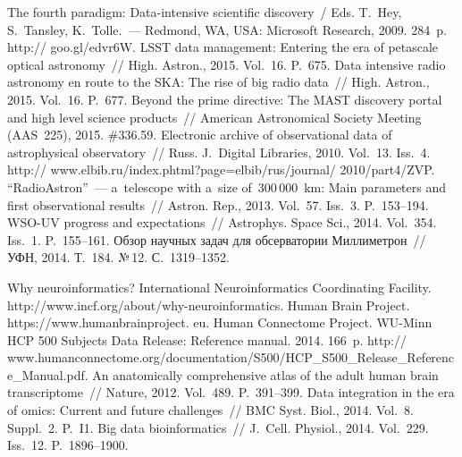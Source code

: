 \begin{multicols}{2}
{{\begin{thebibliography}{99}
The fourth paradigm: Data-intensive scientific discovery~/
Eds. T.~Hey, S.~Tansley, K.~Tolle.~--- Redmond, WA, USA: Microsoft Research, 2009. 284~p.
{\sf http:// goo.gl/edvr6W}.
 LSST data management: Entering the era of petascale optical astronomy~// 
High. Astron., 2015. Vol.~16. P.~675.
 Data intensive radio astronomy en route to the SKA: The rise of big radio data~// 
High. Astron., 2015. Vol.~16. P.~677.
 Beyond the prime directive: The MAST 
discovery portal and high level science products~// American Astronomical Society Meeting (AAS~225), 
2015. \#336.59. 
 Electronic archive of observational data of 
astrophysical observatory~// Russ. J.~Digital Libraries, 2010. Vol.~13. Iss.~4. {\sf 
http:// www.elbib.ru/index.phtml?page=elbib/rus/journal/ 2010/part4/ZVP}.
``RadioAstron''~--- a~telescope with a~size 
of~300\,000~km: Main parameters and first observational results~// Astron. Rep., 2013. Vol.~57. 
Iss.~3. P.~153--194.
 WSO-UV progress and 
expectations~// Astrophys. Space Sci., 2014. Vol.~354. Iss.~1. P.~155--161.
Обзор научных задач для обсерватории Миллиметрон~// УФН, 2014. Т.~184. №\,12. С.~1319--1352.

Why neuroinformatics? International Neuroinformatics Coordinating Facility. {\sf 
http://www.incf.org/about/why-neuroinformatics}.
Human Brain Project. {\sf https://www.humanbrainproject. eu}.
Human Connectome Project. WU-Minn HCP 500 Subjects Data Release: Reference manual. 2014. 166~p. 
{\sf http:// www.humanconnectome.org/documentation/S500/\linebreak HCP\_S500\_Release\_Reference\_Manual.pdf}.
 An anatomically 
comprehensive atlas of the adult human brain transcriptome~// Nature, 2012. Vol.~489. P.~391--399.
 Data integration in the era of omics: Current 
and future challenges~// BMC Syst. Biol., 2014. Vol.~8. Suppl.~2. P.~I1.
 Big data bioinformatics~// J.~Cell. 
Physiol., 2014. Vol.~229. Iss.~12. P.~1896--1900.


\end{thebibliography}}}
\end{multicols}
